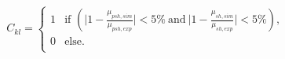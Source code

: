  \begin{equation}
  C_{kl} = 
 \begin{cases}
1 & \text{if } (\lvert{1-\frac{\mu_{psh,sim}}{\mu_{psh,exp}}}\rvert < 5\% ~\text{and}~ \lvert{1-\frac{\mu_{sh,sim}}{\mu_{sh,exp}}}\rvert < 5\% ) ,\\
0 & \text{else} .\\ 
\end{cases}
 \label{eq:check}
\end{equation}
